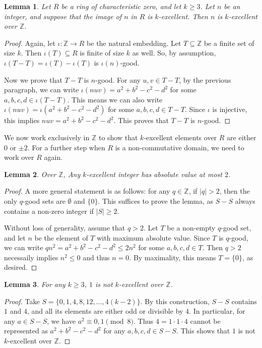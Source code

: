 \documentclass{article}
\newcommand{\Z}{\mathbb{Z}}
\newtheorem{lemma}{Lemma}
\begin{document}
\begin{lemma}\label{2017a2-3}
Let $R$ be a ring of characteristic zero, and let $k \geq 3$.
Let $n$ be an integer, and suppose that the image of $n$ in $R$ is $k$-excellent.
Then $n$ is $k$-excellent over $\Z$.
\end{lemma}
\begin{proof}
Again, let $\iota : \Z \to R$ be the natural embedding.
Let $T \subseteq \Z$ be a finite set of size $k$.
Then $\iota(T) \subseteq R$ is finite of size $k$ as well.
So, by assumption, $\iota(T - T) = \iota(T) - \iota(T)$ is $\iota(n)$-good.
 
Now we prove that $T - T$ is $n$-good.
For any $u, v \in T - T$, by the previous paragraph, we can write $\iota(nuv) = a^2 + b^2 - c^2 - d^2$ for some $a, b, c, d \in \iota(T - T)$.
This means we can also write $\iota(nuv) = \iota(a^2 + b^2 - c^2 - d^2)$ for some $a, b, c, d \in T - T$.
Since $\iota$ is injective, this implies $nuv = a^2 + b^2 - c^2 - d^2$.
This proves that $T - T$ is $n$-good.
\end{proof}

We now work exclusively in $\Z$ to show that $k$-excellent elements over $R$ are either $0$ or $\pm 2$.
For a further step when $R$ is a non-commutative domain, we need to work over $R$ again.

\begin{lemma}\label{2017a2-4}
Over $\Z$, Any $k$-excellent integer has absolute value at most $2$.
\end{lemma}
\begin{proof}
A more general statement is as follows: for any $q \in \Z$, if $|q| > 2$, then the only $q$-good sets are $\emptyset$ and $\{0\}$.
This suffices to prove the lemma, as $S - S$ always contains a non-zero integer if $|S| \geq 2$.

Without loss of generality, assume that $q > 2$.
Let $T$ be a non-empty $q$-good set, and let $n$ be the element of $T$ with maximum absolute value.
Since $T$ is $q$-good, we can write $qn^2 = a^2 + b^2 - c^2 - d^2 \leq 2n^2$ for some $a, b, c, d \in T$.
Then $q > 2$ necessaily implies $n^2 \leq 0$ and thus $n = 0$.
By maximality, this means $T = \{0\}$, as desired.
\end{proof}

\begin{lemma}\label{2017a2-5}
For any $k \geq 3$, $1$ is not $k$-excellent over $\Z$.
\end{lemma}
\begin{proof}
Take $S = \{0, 1, 4, 8, 12, \ldots, 4(k - 2)\}$.
By this construction, $S - S$ contains $1$ and $4$, and all its elements are either odd or divisible by $4$.
In particular, for any $a \in S - S$, we have $a^2 \equiv 0, 1 \pmod{8}$.
Thus $4 = 1 \cdot 1 \cdot 4$ cannot be represented as $a^2 + b^2 - c^2 - d^2$ for any $a, b, c, d \in S - S$.
This shows that $1$ is not $k$-excellent over $\Z$.
\end{proof}
\end{document}
